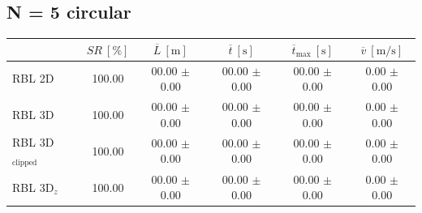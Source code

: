         \subsection{N = 5 circular}
            \begin{table}[H]
                \centering
                \renewcommand{\arraystretch}{1.2}
                \begin{tabular}{|l|c|c|c|c|c|}
                \hline
                                            & \( SR \ [\%] \) & \( \overline{L} \ [\mathrm{m}] \) & \( \overline{t} \ [\mathrm{s}] \) & \( \overline{t}_{\text{max}} \ [\mathrm{s}] \) & \( \overline{v} \ [\mathrm{m/s}] \)     \\ \hline
                RBL 2D                      & 100.00          & 00.00 $\pm$ 0.00                  & 00.00 $\pm$ 0.00                  & 00.00 $\pm$ 0.00                               & 0.00 $\pm$ 0.00                         \\ \hline
                RBL 3D                      & 100.00          & 00.00 $\pm$ 0.00                  & 00.00 $\pm$ 0.00                  & 00.00 $\pm$ 0.00                               & 0.00 $\pm$ 0.00                         \\ \hline
                RBL 3D\(_{\text{clipped}}\) & 100.00          & 00.00 $\pm$ 0.00                  & 00.00 $\pm$ 0.00                  & 00.00 $\pm$ 0.00                               & 0.00 $\pm$ 0.00                         \\ \hline
                RBL 3D\(_z\)                & 100.00          & 00.00 $\pm$ 0.00                  & 00.00 $\pm$ 0.00                  & 00.00 $\pm$ 0.00                               & 0.00 $\pm$ 0.00                         \\ \hline
                \end{tabular}
            \end{table}

